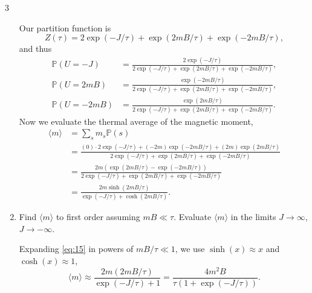 \documentclass[11pt]{article}
\begin{document}
\begin{problem}{3}
\begin{enumerate}[label=(\alph*)]
\begin{answer}
            Our partition function is
            \begin{equation}
            \label{eq:13}
              Z(\tau) = 2\exp(-J/\tau) + \exp(2mB/\tau) + \exp(-2mB/\tau),
            \end{equation}
            and thus
            \begin{equation}
            \label{eq:14}
            \begin{aligned}
              \mathbb{P}(U=-J) &= \frac{2\exp(-J/\tau)}{2\exp(-J/\tau) + \exp(2mB/\tau) + \exp(-2mB/\tau)}, \\[1.5ex]
              \mathbb{P}(U=2mB) &= \frac{\exp(-2mB/\tau)}{2\exp(-J/\tau) + \exp(2mB/\tau) + \exp(-2mB/\tau)}, \\[1.5ex]
              \mathbb{P}(U=-2mB) &= \frac{\exp(2mB/\tau)}{2\exp(-J/\tau) + \exp(2mB/\tau) + \exp(-2mB/\tau)}.
            \end{aligned}
            \end{equation}
Now we evaluate the thermal average of the magnetic moment,
          \begin{equation}
          \label{eq:15}
          \begin{aligned}
            \langle m \rangle &= \sum_s m_s \mathbb{P}(s) \\
            &= \frac{(0) \cdot 2\exp(-J/\tau) + (-2m)\exp(-2mB/\tau) + (2m)\exp(2mB/\tau)}{2\exp(-J/\tau) + \exp(2mB/\tau) + \exp(-2mB/\tau)} \\[1.5ex]
            &= \frac{2m\left( \exp(2mB/\tau) - \exp(-2mB/\tau) \right)}{2\exp(-J/\tau) + \exp(2mB/\tau) + \exp(-2mB/\tau)} \\[1.5ex]
            &= \frac{2m\sinh(2mB/\tau)}{\exp(-J/\tau) + \cosh(2mB/\tau)}.
          \end{aligned}
          \end{equation}
        \end{answer}
    \item Find \( \langle m \rangle \) to first order assuming \( mB \ll \tau \). Evaluate \( \langle m \rangle \) in the limits \( J \rightarrow \infty \), \( J \rightarrow -\infty \).
        \begin{answer}
          Expanding \cref{eq:15} in powers of \( mB/\tau \ll 1 \), we use \( \sinh(x) \approx x \) and \( \cosh(x) \approx 1 \),
          \begin{equation}
          \label{eq:16}
          \langle m \rangle \approx \frac{2m (2mB/\tau)}{\exp(-J/\tau) + 1} = \frac{4m^2 B}{\tau \left(1 + \exp(-J/\tau)\right)}.

\end{equation}
\end{answer}
\end{enumerate}
\end{problem}
\end{document}
